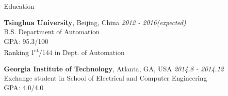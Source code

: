 \documentclass{resume} %
\begin{document}

\begin{rSection}{Education}

{\bf Tsinghua University}, Beijing, China \hfill {\em 2012 - 2016(expected)} \\ 
B.S. Department of Automation \\
GPA: 95.3/100\\
Ranking 1\textsuperscript{st}/144 in Dept. of Automation

{\bf Georgia Institute of Technology}, Atlanta, GA, USA \hfill {\em 2014.8 - 2014.12} \\ 
Exchange student in School of Electrical and Computer Engineering\\
GPA: 4.0/4.0


\end{rSection}

\end{document}
